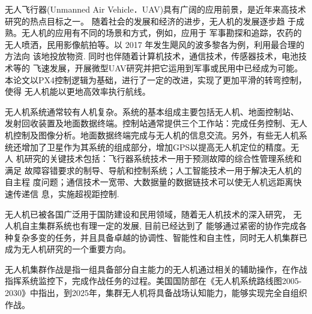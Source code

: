 无人飞行器(Unmanned Air Vehicle．UAV)具有广阔的应用前景，是近年来高技术研究的热点目标之一。
    随着社会的发展和经济的进步，无人机的发展逐步趋
于成熟。无人机的应用有不同的场景和方式，例如，应用于
军事勘探和追踪，农药的无人喷洒，民用影像航拍等。以
2017 年发生飓风的波多黎各为例，利用最合理的方法向
该地投放物资. 同时也伴随着计算机技术，通信技术，传感器技术，电池技术等的
    飞速发展，开展微型UAV研究并把它运用到军事或民用中已经成为可能。
    本论文以PX4控制逻辑为基础，进行了一定的改进，实现了更加平滑的转弯控制，使得
    无人机能以更地高效率执行航线。\par
    无人机系统通常较有人机复杂。系统的基本组成主要包括无人机、地面控制站、
发射回收装置及地面数据终端。控制站通常提供三个工作站：完成任务控制、无人
机控制及图像分析。地面数据终端完成与无人机的信息交流。另外，有些无人机系
统还增加了卫星作为其系统的组成部分，增加GPS以提高无人机定位的精度。无人
机研究的关键技术包括：飞行器系统技术一用于预测故障的综合性管理系统和满足
故障容错要求的制导、导航和控制系统；人工智能技术一用于解决无人机的自主程
度问题；通信技术一宽带、大数据量的数据链技术可以使无人机远距离快速传递信
息，实施超视距控制.\par
    无人机已被各国广泛用于国防建设和民用领域，随着无人机技术的深入研究，
    无人机自主集群系统也有理一定的发展, 目前已经达到了
能够通过紧密的协作完成各种复杂多变的任务，并且具备卓越的协调性、智能性和自主性，同时无人机集群已成为无人机研究的一个重要方向。\par
无人机集群作战是指一组具备部分自主能力的无人机通过相关的辅助操作，在作战指挥系统监控下，完成作战任务的过程。美国国防部在《无人机系统路线图2005-2030》中指出，到2025年，集群无人机将具备战场认知能力，能够实现完全自组织作战。
\par
